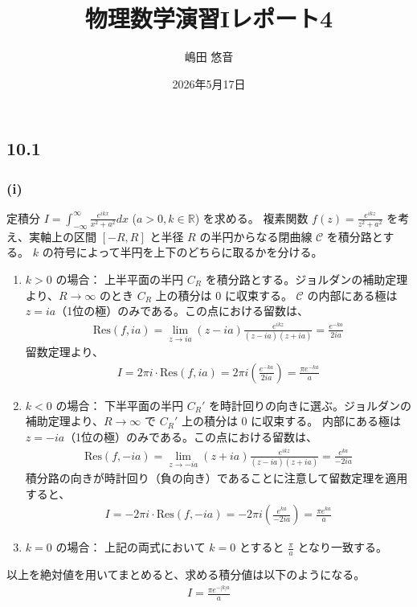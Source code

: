 \documentclass[platex,dvipdfmx,a4paper]{jsarticle}
\title{物理数学演習Iレポート4}
\author{嶋田 悠音}
\date{2026年5月17日}
\begin{document}
  \maketitle
  \subsection*{10.1}

  \subsubsection*{(i)}
  定積分 $I = \int_{-\infty}^{\infty} \frac{e^{ikx}}{x^2+a^2} dx$ ($a>0, k \in \mathbb{R}$) を求める。
  複素関数 $f(z) = \frac{e^{ikz}}{z^2+a^2}$ を考え、実軸上の区間 $[-R, R]$ と半径 $R$ の半円からなる閉曲線 $\mathcal{C}$ を積分路とする。 $k$ の符号によって半円を上下のどちらに取るかを分ける。

  \begin{enumerate}
      \item $k > 0$ の場合：
      上半平面の半円 $C_R$ を積分路とする。ジョルダンの補助定理より、$R \to \infty$ のとき $C_R$ 上の積分は $0$ に収束する。
      $\mathcal{C}$ の内部にある極は $z = ia$（1位の極）のみである。この点における留数は、
      \begin{align*}
      \text{Res}(f, ia) = \lim_{z \to ia} (z-ia) \frac{e^{ikz}}{(z-ia)(z+ia)} = \frac{e^{-ka}}{2ia}
      \end{align*}
      留数定理より、
      \begin{align*}
      I = 2\pi i \cdot \text{Res}(f, ia) = 2\pi i \left( \frac{e^{-ka}}{2ia} \right) = \frac{\pi e^{-ka}}{a}
      \end{align*}

      \item $k < 0$ の場合：
      下半平面の半円 $C_R'$ を時計回りの向きに選ぶ。ジョルダンの補助定理より、$R \to \infty$ で $C_R'$ 上の積分は $0$ に収束する。
      内部にある極は $z = -ia$（1位の極）のみである。この点における留数は、
      \begin{align*}
      \text{Res}(f, -ia) = \lim_{z \to -ia} (z+ia) \frac{e^{ikz}}{(z-ia)(z+ia)} = \frac{e^{ka}}{-2ia}
      \end{align*}
      積分路の向きが時計回り（負の向き）であることに注意して留数定理を適用すると、
      \begin{align*}
      I = -2\pi i \cdot \text{Res}(f, -ia) = -2\pi i \left( \frac{e^{ka}}{-2ia} \right) = \frac{\pi e^{ka}}{a}
      \end{align*}

      \item $k = 0$ の場合：
      上記の両式において $k=0$ とすると $\frac{\pi}{a}$ となり一致する。
  \end{enumerate}
  以上を絶対値を用いてまとめると、求める積分値は以下のようになる。
  \begin{align*}
  I = \frac{\pi e^{-|k|a}}{a}
  \end{align*}
\end{document}
